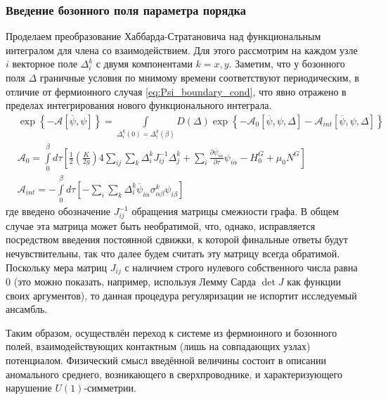 \subsubsection{Введение бозонного поля параметра порядка}
Проделаем преобразование Хаббарда-Стратановича над функциональным интегралом для члена со взаимодействием. Для этого рассмотрим на каждом узле $i$ векторное поле $\Delta^k_i$ с двумя компонентами $k = x,y$. Заметим, что у бозонного поля $\Delta$ граничные условия по мнимому времени соответствуют периодическим, в отличие от фермионного случая \eqref{eq:Psi_boundary_cond}, что явно отражено в пределах интегрирования нового функционального интеграла.
\begin{align}
	\label{eq:Hubbard_Stratanovich_transrom}
	& \exp\left\{ -\mathcal{A}\left[ \overline{\psi}, \psi \right] \right\}  = \int\limits_{\Delta^k_i(0) = \Delta^k_i(\beta)} D(\Delta) \exp\left\{ -\mathcal{A}_{0}\left[ \overline{\psi}, \psi, \Delta \right] -\mathcal{A}_{int}\left[ \overline{\psi}, \psi, \Delta \right] \right\} \\
	\label{eq:Total_quadratic_action}
	& \mathcal{A}_{0} = \int\limits_{0}^{\beta} d\tau \left[ \frac{1}{2} \left(\frac{K}{2g}\right) 4\sum_{ij} \sum_k \Delta^k_i J^{-1}_{ij} \Delta^k_j + \sum_{i} \frac{\partial \overline{\psi}_{i\alpha} }{ \partial \tau } \psi_{i\alpha} - H^{G}_0 + \mu_0 N^{G} \right] \\	
	\label{eq:Boson_fermion_interaction_action}
	& \mathcal{A}_{int} = -\int\limits_{0}^{\beta} d\tau \left[ - \sum_{i} \sum_k \Delta^k_i \overline{\psi}_{i\alpha} \sigma^k_{\alpha\beta} \psi_{i\beta} \right] 
\end{align}
где введено обозначение $J_{ij}^{-1}$ обращения матрицы смежности графа. В общем случае эта матрица может быть необратимой, что, однако, исправляется посредством введения постоянной сдвижки, к которой финальные ответы будут нечувствительны, так что далее будем считать эту матрицу всегда обратимой. Поскольку мера матриц $J_{ij}$ с наличием строго нулевого собственного числа равна 0 (это можно показать, например, используя Лемму Сарда $\det J$ как функции своих аргументов), то данная процедура регуляризации не испортит исследуемый ансамбль.

Таким образом, осуществлён переход к системе из фермионного и бозонного полей, взаимодействующих контактным (лишь на совпадающих узлах) потенциалом. Физический смысл введённой величины состоит в описании аномального среднего, возникающего в сверхпроводнике, и характеризующего нарушение $U(1)$-симметрии.

